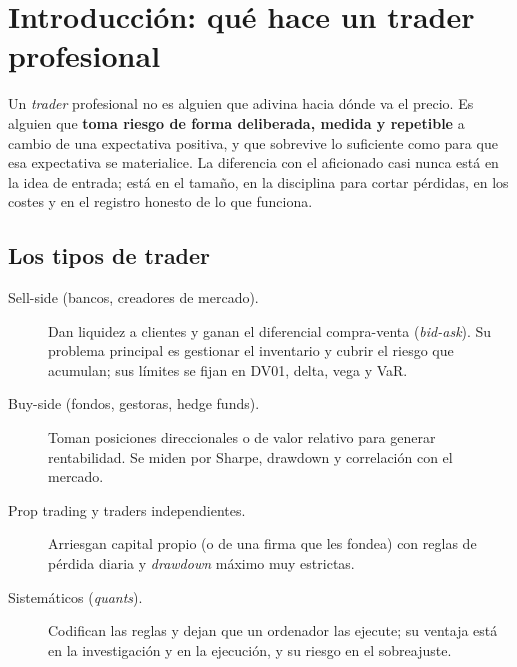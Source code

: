 \chapter{Introducción: qué hace un trader profesional}\label{cap:intro}

Un \emph{trader} profesional no es alguien que adivina hacia dónde va el precio. Es alguien que
\textbf{toma riesgo de forma deliberada, medida y repetible} a cambio de una expectativa positiva, y que
sobrevive lo suficiente como para que esa expectativa se materialice. La diferencia con el aficionado
casi nunca está en la idea de entrada; está en el tamaño, en la disciplina para cortar pérdidas, en los
costes y en el registro honesto de lo que funciona.

\section{Los tipos de trader}
\begin{description}
\item[Sell-side (bancos, creadores de mercado).] Dan liquidez a clientes y ganan el diferencial
  compra-venta (\emph{bid-ask}). Su problema principal es gestionar el inventario y cubrir el riesgo
  que acumulan; sus límites se fijan en DV01, delta, vega y VaR.
\item[Buy-side (fondos, gestoras, hedge funds).] Toman posiciones direccionales o de valor relativo para
  generar rentabilidad. Se miden por Sharpe, drawdown y correlación con el mercado.
\item[Prop trading y traders independientes.] Arriesgan capital propio (o de una firma que les fondea)
  con reglas de pérdida diaria y \emph{drawdown} máximo muy estrictas.
\item[Sistemáticos (\emph{quants}).] Codifican las reglas y dejan que un ordenador las ejecute; su
  ventaja está en la investigación y en la ejecución, y su riesgo en el sobreajuste.
\end{description}

